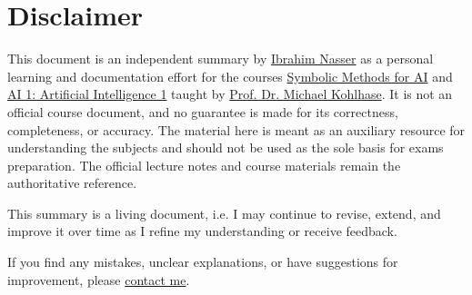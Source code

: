 \section*{Disclaimer}
This document is an independent summary by \href{https://96ibman.github.io/ibrahim-nasser/}{Ibrahim Nasser} as a personal learning and documentation effort for the courses \href{https://alea.education/FAU/smai/WS25-26}{Symbolic Methods for AI} and \href{https://alea.education/course-home/ai-1}{AI 1: Artificial Intelligence 1} taught by \href{https://kwarc.info/people/mkohlhase/}{Prof. Dr. Michael Kohlhase}.
It is not an official course document, and no guarantee is made for its correctness, completeness, or accuracy.
The material here is meant as an auxiliary resource for understanding the subjects and should not be used as the sole basis for exams preparation. The official lecture notes and course materials remain the authoritative reference.

This summary is a living document, i.e. I may continue to revise, extend, and improve it over time as I refine my understanding or receive feedback.

If you find any mistakes, unclear explanations, or have suggestions for improvement, please \href{mailto:ibrahim.nasser@fau.de}{contact me}.